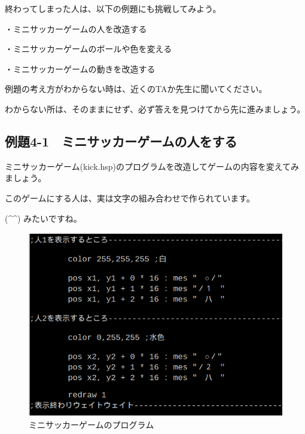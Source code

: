 終わってしまった人は、以下の例題にも挑戦してみよう。


・ミニサッカーゲームの人を改造する

・ミニサッカーゲームのボールや色を変える

・ミニサッカーゲームの動きを改造する



例題の考え方がわからない時は、近くのTAか先生に聞いてください。

わからない所は、そのままにせず、必ず答えを見つけてから先に進みましょう。
\newpage
\subsection{例題4-1　ミニサッカーゲームの人をする}

\begin{description}
    \item {}
\end{description}

ミニサッカーゲーム(kick.hsp)のプログラムを改造してゲームの内容を変えてみましょう。

このゲームにする人は、実は文字の組み合わせで作られています。

(\^{}\^{}) みたいですね。


\begin{figure}[H]
    \begin{center}
      \includegraphics[keepaspectratio,width=12.326cm,height=8.123cm]{text04-img/s_kicksrc1.png}
      \caption{ミニサッカーゲームのプログラム}
    \end{center}
    \label{fig:prog_menu}
\end{figure}



